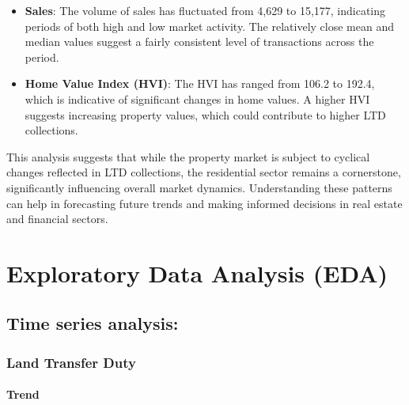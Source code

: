 \documentclass[11pt,a4paper,]{article}
\providecommand{\tightlist}{%
  \setlength{\itemsep}{0pt}\setlength{\parskip}{0pt}}
\begin{document}
\begin{enumerate}
  \begin{itemize}
  \tightlist
  \item
    \textbf{Sales}: The volume of sales has fluctuated from 4,629 to 15,177, indicating periods of both high and low market activity. The relatively close mean and median values suggest a fairly consistent level of transactions across the period.
  \item
    \textbf{Home Value Index (HVI)}: The HVI has ranged from 106.2 to 192.4, which is indicative of significant changes in home values. A higher HVI suggests increasing property values, which could contribute to higher LTD collections.
  \end{itemize}
\end{enumerate}

This analysis suggests that while the property market is subject to cyclical changes reflected in LTD collections, the residential sector remains a cornerstone, significantly influencing overall market dynamics. Understanding these patterns can help in forecasting future trends and making informed decisions in real estate and financial sectors.

\section{Exploratory Data Analysis (EDA)}\label{exploratory-data-analysis-eda}

\subsection{Time series analysis:}\label{time-series-analysis}

\subsubsection{Land Transfer Duty}\label{land-transfer-duty}

\paragraph{Trend}\label{trend}
\end{document}
